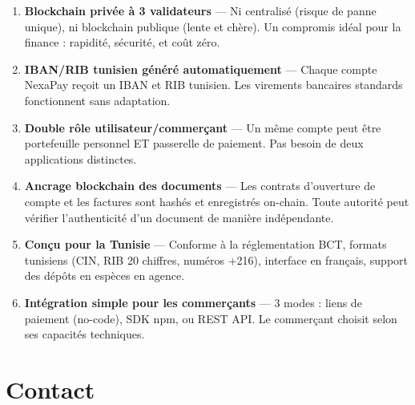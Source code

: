 \documentclass[11pt,a4paper]{article}
\begin{document}
\begin{enumerate}[leftmargin=*]
    \item \textbf{Blockchain priv\'ee \`a 3 validateurs} --- Ni centralis\'e (risque de panne unique), ni blockchain publique (lente et ch\`ere). Un compromis id\'eal pour la finance : rapidit\'e, s\'ecurit\'e, et co\^ut z\'ero.

    \item \textbf{IBAN/RIB tunisien g\'en\'er\'e automatiquement} --- Chaque compte NexaPay re\c{c}oit un IBAN et RIB tunisien. Les virements bancaires standards fonctionnent sans adaptation.

    \item \textbf{Double r\^ole utilisateur/commer\c{c}ant} --- Un m\^eme compte peut \^etre portefeuille personnel ET passerelle de paiement. Pas besoin de deux applications distinctes.

    \item \textbf{Ancrage blockchain des documents} --- Les contrats d'ouverture de compte et les factures sont hash\'es et enregistr\'es on-chain. Toute autorit\'e peut v\'erifier l'authenticit\'e d'un document de mani\`ere ind\'ependante.

    \item \textbf{Con\c{c}u pour la Tunisie} --- Conforme \`a la r\'eglementation BCT, formats tunisiens (CIN, RIB 20 chiffres, num\'eros +216), interface en fran\c{c}ais, support des d\'ep\^ots en esp\`eces en agence.

    \item \textbf{Int\'egration simple pour les commer\c{c}ants} --- 3 modes : liens de paiement (no-code), SDK npm, ou REST API. Le commer\c{c}ant choisit selon ses capacit\'es techniques.
\end{enumerate}

\newpage

\section{Contact}
\end{document}
